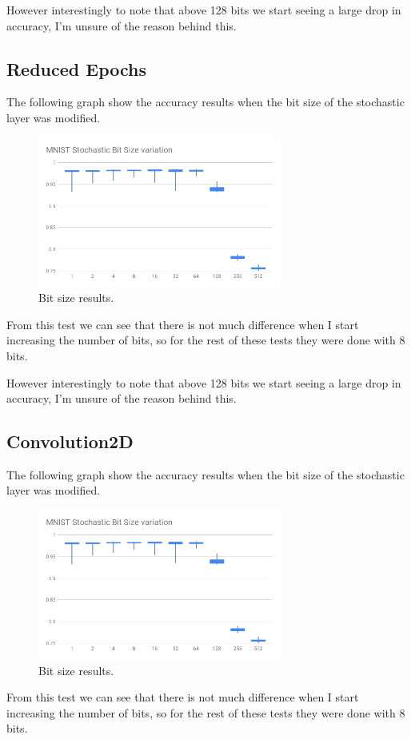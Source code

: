 \documentclass[a4paper,twoside,phd]{BYUPhys}
\begin{document}
However interestingly to note that above 128 bits we start seeing a large drop in accuracy, I'm unsure of the reason behind this.

\subsection{Reduced Epochs}
The following graph show the accuracy results when the bit size of the stochastic layer was modified.
\begin{figure}[H]
\centering
\includegraphics[width=8cm]{results/bitsize.png}
\caption{Bit size results.}
\label{fig:bitsize}
\end{figure}
From this test we can see that there is not much difference when I start increasing the number of bits, so for the rest of these tests they were done with 8 bits.

However interestingly to note that above 128 bits we start seeing a large drop in accuracy, I'm unsure of the reason behind this.

\subsection{Convolution2D}
The following graph show the accuracy results when the bit size of the stochastic layer was modified.
\begin{figure}[H]
\centering
\includegraphics[width=8cm]{results/bitsize.png}
\caption{Bit size results.}
\label{fig:bitsize}
\end{figure}
From this test we can see that there is not much difference when I start increasing the number of bits, so for the rest of these tests they were done with 8 bits.
\end{document}
